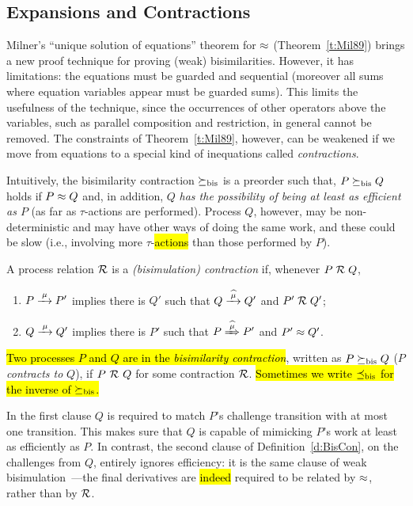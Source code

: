\subsection{Expansions and Contractions}
\label{s:mcontr}

Milner's ``unique solution of equations'' theorem for $\approx$
(Theorem~\ref{t:Mil89})
brings a new proof technique for proving (weak) bisimilarities. However, it has
 limitations: the equations must be guarded and sequential (moreover
all sums where equation variables appear must be guarded sums).
This limits the usefulness of the technique, since
the occurrences of other operators above the variables, such as parallel
composition and restriction, in general cannot be removed.
The constraints of Theorem~\ref{t:Mil89}, however, can be 
weakened if we move from equations to a special kind of inequations called
  \emph{contractions}.

Intuitively, the bisimilarity contraction $\mathrel{\succeq_{\rm{bis}}}$ is a preorder
such that, $P \mathrel{\succeq_{\rm{bis}}} Q$ holds if $P \approx Q$ and, in addition, 
$Q$ \emph{has the possibility of being at least as efficient as $P$} (as far as
$\tau$-actions are performed).
Process $Q$, however, may be non-deterministic and may have other ways
of doing the same work, and these could be slow (i.e., involving
more $\tau$-\hl{actions} than those performed by $P$).

\begin{definition}[contraction]
\label{d:BisCon}
A process relation ${{\cal R}}$ 
 is a \emph{(bisimulation) contraction} if, whenever
 $P\mathrel{\cal R} Q$, %

\begin{enumerate}
\item   $P \arr\mu P'$ implies there is $Q'$ such that $Q \arcap \mu
  Q'$ and $P' \mathrel{\cal R} Q'$;
\item $Q \arr\mu Q'$   implies there is $P'$ such that $P \Arcap \mu
 P'$ and $P' \approx Q'$\enspace.
\end{enumerate}
\hl{Two processes $P$ and $Q$ are in the \emph{bisimilarity
    contraction}}, written as $P \mathrel{\succeq_{\rm{bis}}} Q$ ($P$ \emph{contracts to} $Q$),
if $P\ {\cal R}\ Q$ for some contraction ${\cal R}$.
\hl{Sometimes we write $\mathrel{\preceq_{\rm{bis}}}$ for the inverse of $\mathrel{\succeq_{\rm{bis}}}$.}
\end{definition}

In the first clause $Q$ is required to match $P$'s challenge
transition with at most one transition.
This makes sure that $Q$ is capable of mimicking %
$P$'s work at least as efficiently as $P$. 
In contrast, the second clause of Definition~\ref{d:BisCon}, on the
challenges from $Q$, entirely ignores efficiency: it is the same
clause of  weak bisimulation~---the final derivatives are \hl{indeed} required
to be related  by $\approx$, rather than by ${\cal R}$.

